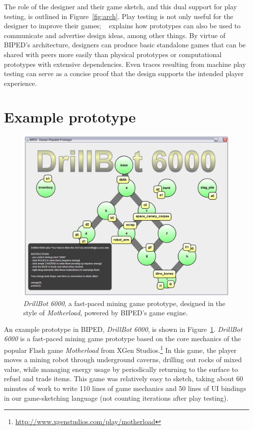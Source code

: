 \documentclass[letterpaper]{article}
\newcommand{\citenoun}[1]{\citeauthor{#1}~\shortcite{#1}}
\begin{document}
The role of the designer and their game sketch, and this dual support for play
testing, is outlined in Figure~\ref{fig:arch}. Play testing is not only useful
for the designer to improve their games; \citenoun{Niedenthal:DiGRA}
explains how prototypes can also be used to communicate and advertise design
ideas, among other things. By virtue of BIPED's architecture, designers can
produce basic standalone games that can be shared with peers more easily than
physical prototypes or computational prototypes with extensive dependencies.
Even traces resulting from machine play testing can serve as a concise
proof that the design supports the intended player experience.

\section{Example prototype}

\begin{figure}
\includegraphics[width=\columnwidth]{db6k_screenshot.png}
\caption{\emph{DrillBot 6000}, a fast-paced mining game prototype, designed in
the style of \emph{Motherload}, powered by BIPED's game engine.}
\label{fig:screenshots}
\end{figure}

An example prototype in BIPED, \emph{DrillBot 6000}, is shown in Figure~\ref{fig:screenshots}.
\emph{DrillBot 6000} is a fast-paced mining game prototype based on
the core mechanics of the popular Flash game \emph{Motherload} from XGen
Studios.\footnote{\url{http://www.xgenstudios.com/play/motherload}} In this
game, the player moves a mining robot through underground caverns, drilling out
rocks of mixed value, while managing energy usage by periodically returning to
the surface to refuel and trade items. This game was relatively easy to sketch,
taking about 60 minutes of work to write 110 lines of game mechanics and 50
lines of UI bindings in our game-sketching language (not counting iterations
after play testing).
\end{document}
